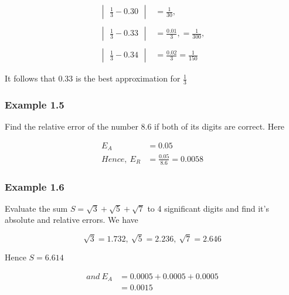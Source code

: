 \documentclass[11pt, a4paper, oneside]{book}
\begin{document}
              \begin{align*}
                \begin{vmatrix}
                  \frac{1}{3}-0.30
                \end{vmatrix} &= \frac{1}{30},\\
              \\
                \begin{vmatrix}
                  \frac{1}{3}-0.33
                \end{vmatrix} &= \frac{0.01}{3},=\frac{1}{300},\\
              \\
                \begin{vmatrix}
                  \frac{1}{3}-0.34
                \end{vmatrix} &= \frac{0.02}{3}=\frac{1}{150}
              \end{align*}

              It follows that 0.33 is the best approximation for $\frac{1}{3}$

            \subsubsection{Example 1.5}
              Find the relative error of the number 8.6 if both of its digits are correct.
              Here

              \begin{align*}
                        E_A &= 0.05 \\
                Hence,\ E_R &= \frac{0.05}{8.6}=0.0058
              \end{align*}

            \subsubsection{Example 1.6}
              Evaluate the sum $S = \sqrt{3} + \sqrt{5} + \sqrt{7}$ to 4 significant digits and
              find it's absolute and relative errors. We have

              \begin{equation*}
              \sqrt{3}=1.732,\ \sqrt{5}=2.236,\ \sqrt{7}=2.646
              \end{equation*}

              Hence $S=6.614$

              \begin{align*}
                and\ E_A &= 0.0005+0.0005+0.0005 \\
                         &= 0.0015
              \end{align*}
\end{document}
